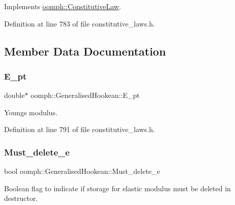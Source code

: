 Implements \hyperlink{classoomph_1_1ConstitutiveLaw_a446452158a8ae9fbc3dde4277155f824}{oomph\+::\+Constitutive\+Law}.



Definition at line 783 of file constitutive\+\_\+laws.\+h.



\subsection{Member Data Documentation}
\mbox{\label{classoomph_1_1GeneralisedHookean_a7a68b35f227848a065a7a844766b4eeb}} 
\subsubsection{\texorpdfstring{E\+\_\+pt}{E\_pt}}
{\footnotesize\ttfamily double$\ast$ oomph\+::\+Generalised\+Hookean\+::\+E\+\_\+pt\hspace{0.3cm}{\ttfamily [private]}}



Young\textquotesingle{}s modulus. 



Definition at line 791 of file constitutive\+\_\+laws.\+h.

\mbox{\label{classoomph_1_1GeneralisedHookean_a21d4ef7498c2efd5bf30fa0ecd0d7dd5}} 
\subsubsection{\texorpdfstring{Must\+\_\+delete\+\_\+e}{Must\_delete\_e}}
{\footnotesize\ttfamily bool oomph\+::\+Generalised\+Hookean\+::\+Must\+\_\+delete\+\_\+e\hspace{0.3cm}{\ttfamily [private]}}



Boolean flag to indicate if storage for elastic modulus must be deleted in destructor. 



